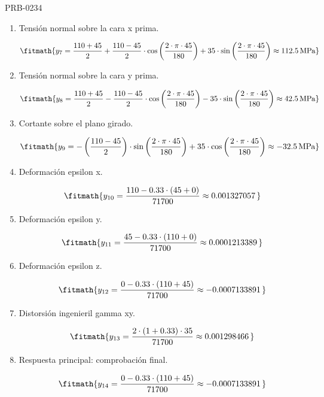 \begin{studiumworked}{PRB-0234}
\begin{enumerate}
\item Tensión normal sobre la cara x prima.

\[\fitmath{y_{7}=\frac{110+45}{2}+\frac{110-45}{2}\cdot \cos\left(\frac{2\cdot \pi\cdot 45}{180}\right)+35\cdot \sin\left(\frac{2\cdot \pi\cdot 45}{180}\right)\approx 112.5\,\mathrm{MPa}}\]

\item Tensión normal sobre la cara y prima.

\[\fitmath{y_{8}=\frac{110+45}{2}-\frac{110-45}{2}\cdot \cos\left(\frac{2\cdot \pi\cdot 45}{180}\right)-35\cdot \sin\left(\frac{2\cdot \pi\cdot 45}{180}\right)\approx 42.5\,\mathrm{MPa}}\]

\item Cortante sobre el plano girado.

\[\fitmath{y_{9}=-\left(\frac{110-45}{2}\right)\cdot \sin\left(\frac{2\cdot \pi\cdot 45}{180}\right)+35\cdot \cos\left(\frac{2\cdot \pi\cdot 45}{180}\right)\approx -32.5\,\mathrm{MPa}}\]

\item Deformación epsilon x.

\[\fitmath{y_{10}=\frac{110-0.33\cdot \left(45+0\right)}{71700}\approx 0.001327057\,}\]

\item Deformación epsilon y.

\[\fitmath{y_{11}=\frac{45-0.33\cdot \left(110+0\right)}{71700}\approx 0.0001213389\,}\]

\item Deformación epsilon z.

\[\fitmath{y_{12}=\frac{0-0.33\cdot \left(110+45\right)}{71700}\approx -0.0007133891\,}\]

\item Distorsión ingenieril gamma xy.

\[\fitmath{y_{13}=\frac{2\cdot \left(1+0.33\right)\cdot 35}{71700}\approx 0.001298466\,}\]

\item Respuesta principal: comprobación final.

\[\fitmath{y_{14}=\frac{0-0.33\cdot \left(110+45\right)}{71700}\approx -0.0007133891\,}\]

\end{enumerate}


\end{studiumworked}
